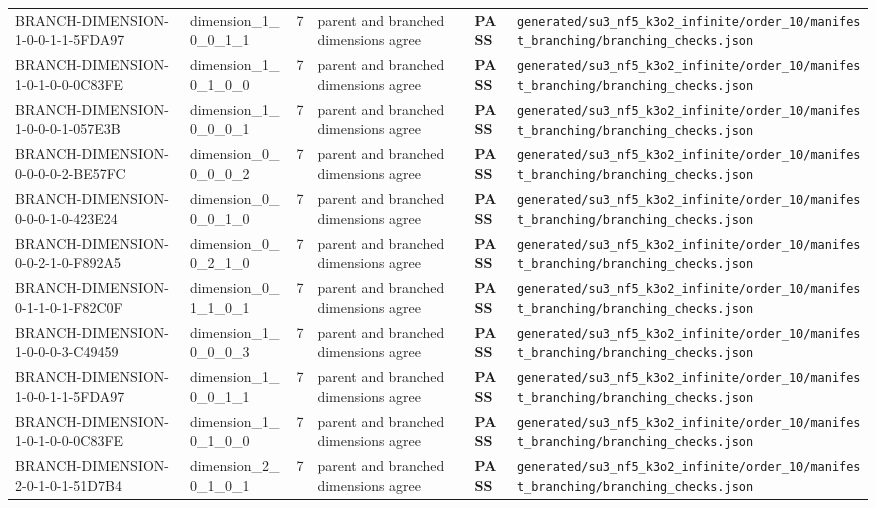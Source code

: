 \documentclass[11pt]{article}
\newcommand{\Pass}{\textcolor{green!50!black}{\textbf{PASS}}}
\newcommand{\RawPath}[1]{\texttt{#1}}
\begin{document}
\begin{longtable}{p{3cm}p{2.5cm}r p{3cm}l p{2cm}}
BRANCH-DIMENSION-1-0-0-1-1-5FDA97 & dimension\_1\_0\_0\_1\_1 & 7 & parent and branched dimensions agree & \Pass & \RawPath{generated/su3\_nf5\_k3o2\_infinite/order\_10/manifest\_branching/branching\_checks.json}\\
BRANCH-DIMENSION-1-0-1-0-0-0C83FE & dimension\_1\_0\_1\_0\_0 & 7 & parent and branched dimensions agree & \Pass & \RawPath{generated/su3\_nf5\_k3o2\_infinite/order\_10/manifest\_branching/branching\_checks.json}\\
BRANCH-DIMENSION-1-0-0-0-1-057E3B & dimension\_1\_0\_0\_0\_1 & 7 & parent and branched dimensions agree & \Pass & \RawPath{generated/su3\_nf5\_k3o2\_infinite/order\_10/manifest\_branching/branching\_checks.json}\\
BRANCH-DIMENSION-0-0-0-0-2-BE57FC & dimension\_0\_0\_0\_0\_2 & 7 & parent and branched dimensions agree & \Pass & \RawPath{generated/su3\_nf5\_k3o2\_infinite/order\_10/manifest\_branching/branching\_checks.json}\\
BRANCH-DIMENSION-0-0-0-1-0-423E24 & dimension\_0\_0\_0\_1\_0 & 7 & parent and branched dimensions agree & \Pass & \RawPath{generated/su3\_nf5\_k3o2\_infinite/order\_10/manifest\_branching/branching\_checks.json}\\
BRANCH-DIMENSION-0-0-2-1-0-F892A5 & dimension\_0\_0\_2\_1\_0 & 7 & parent and branched dimensions agree & \Pass & \RawPath{generated/su3\_nf5\_k3o2\_infinite/order\_10/manifest\_branching/branching\_checks.json}\\
BRANCH-DIMENSION-0-1-1-0-1-F82C0F & dimension\_0\_1\_1\_0\_1 & 7 & parent and branched dimensions agree & \Pass & \RawPath{generated/su3\_nf5\_k3o2\_infinite/order\_10/manifest\_branching/branching\_checks.json}\\
BRANCH-DIMENSION-1-0-0-0-3-C49459 & dimension\_1\_0\_0\_0\_3 & 7 & parent and branched dimensions agree & \Pass & \RawPath{generated/su3\_nf5\_k3o2\_infinite/order\_10/manifest\_branching/branching\_checks.json}\\
BRANCH-DIMENSION-1-0-0-1-1-5FDA97 & dimension\_1\_0\_0\_1\_1 & 7 & parent and branched dimensions agree & \Pass & \RawPath{generated/su3\_nf5\_k3o2\_infinite/order\_10/manifest\_branching/branching\_checks.json}\\
BRANCH-DIMENSION-1-0-1-0-0-0C83FE & dimension\_1\_0\_1\_0\_0 & 7 & parent and branched dimensions agree & \Pass & \RawPath{generated/su3\_nf5\_k3o2\_infinite/order\_10/manifest\_branching/branching\_checks.json}\\
BRANCH-DIMENSION-2-0-1-0-1-51D7B4 & dimension\_2\_0\_1\_0\_1 & 7 & parent and branched dimensions agree & \Pass & \RawPath{generated/su3\_nf5\_k3o2\_infinite/order\_10/manifest\_branching/branching\_checks.json}\\

\end{longtable}
\end{document}
